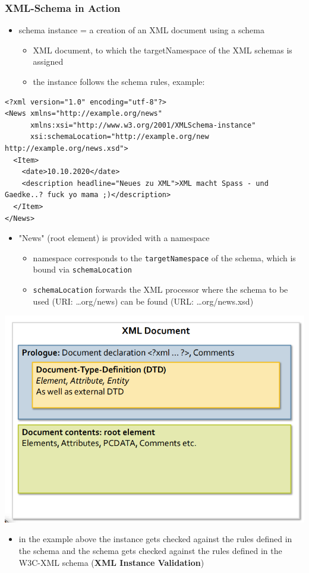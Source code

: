 \documentclass[11pt]{article}
\begin{document}
\subsubsection{XML-Schema in Action}
\label{sec:orgb110357}
\begin{itemize}
\item schema instance = a creation of an XML document using a schema
\begin{itemize}
\item XML document, to which the targetNamespace of the XML schemas is assigned
\item the instance follows the schema rules, example:
\end{itemize}
\end{itemize}
\lstset{breaklines=true,language=XML,label= ,caption= ,captionpos=b,numbers=none}
\begin{lstlisting}
<?xml version="1.0" encoding="utf-8"?>
<News xmlns="http://example.org/news"
      xmlns:xsi="http://www.w3.org/2001/XMLSchema-instance"
      xsi:schemaLocation="http://example.org/new http://example.org/news.xsd">
  <Item>
    <date>10.10.2020</date>
    <description headline="Neues zu XML">XML macht Spass - und Gaedke..? fuck yo mama ;)</description>
  </Item>
</News>
\end{lstlisting}
\begin{itemize}
\item "News" (root element) is provided with a namespace
\begin{itemize}
\item namespace corresponds to the \texttt{targetNamespace} of the schema, which is bound via \texttt{schemaLocation}
\item \texttt{schemaLocation} forwards the XML processor where the schema to be used (URI: \ldots{}org/news) can be found (URL: \ldots{}org/news.xsd)
\end{itemize}
\end{itemize}
\begin{center}
\includegraphics[width=.9\linewidth]{./dtd.png}
\end{center}
\begin{itemize}
\item in the example above the instance gets checked against the rules defined in the schema and the schema gets checked against the rules defined in the W3C-XML schema (\textbf{XML Instance Validation})
\end{itemize}
\end{document}
